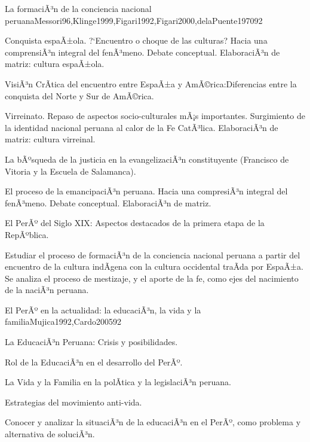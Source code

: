 \begin{syllabus}
\begin{unit}{La formaciÃ³n de la conciencia nacional peruana}{Messori96,Klinge1999,Figari1992,Figari2000,delaPuente1970}{9}{2}
\begin{topics}
      \item Conquista espaÃ±ola. ?`Encuentro o choque de las culturas? Hacia una comprensiÃ³n integral del fenÃ³meno. Debate conceptual. ElaboraciÃ³n de matriz: cultura espaÃ±ola.
      \item VisiÃ³n CrÃ­tica del encuentro entre EspaÃ±a y AmÃ©rica:Diferencias entre la conquista del Norte y Sur de AmÃ©rica.
      \item Virreinato. Repaso de aspectos socio-culturales mÃ¡s importantes. Surgimiento de la identidad nacional peruana al calor de la Fe CatÃ³lica. ElaboraciÃ³n de matriz: cultura virreinal.
      \item La bÃºsqueda de la justicia en la evangelizaciÃ³n constituyente (Francisco de Vitoria y la Escuela de Salamanca).
      \item El proceso de la emancipaciÃ³n peruana. Hacia una compresiÃ³n integral del fenÃ³meno. Debate conceptual. ElaboraciÃ³n de matriz.
      \item El PerÃº del Siglo XIX: Aspectos destacados de la primera etapa de la RepÃºblica.
\end{topics}
\begin{unitgoals}
      \item Estudiar el proceso de formaciÃ³n de la conciencia nacional peruana a partir del encuentro de la cultura indÃ­gena con la cultura occidental traÃ­da por EspaÃ±a. Se analiza el proceso de mestizaje, y el aporte de la fe, como ejes del nacimiento de la naciÃ³n peruana.
\end{unitgoals}
\end{unit}

\begin{unit}{El PerÃº en la actualidad: la educaciÃ³n, la vida y la familia}{Mujica1992,Cardo2005}{9}{2}
\begin{topics}
      \item La EducaciÃ³n Peruana: Crisis y posibilidades.
      \item Rol de la EducaciÃ³n en el desarrollo del PerÃº.
      \item La Vida y la Familia en la polÃ­tica y la legislaciÃ³n peruana.
      \item Estrategias del movimiento anti-vida.
\end{topics}
\begin{unitgoals}
      \item Conocer y analizar la situaciÃ³n de la educaciÃ³n en el PerÃº, como problema y alternativa de soluciÃ³n.
\end{unitgoals}
\end{unit}


\end{syllabus}
